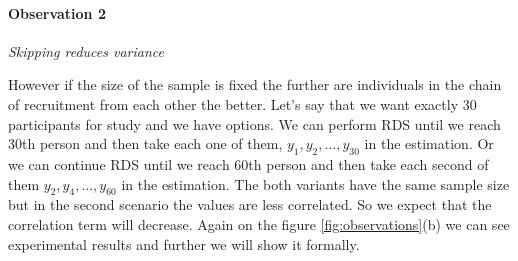 \documentclass[12pt]{report}
\begin{document}
\paragraph{Observation 2} \textit{Skipping reduces variance}

However if the size of the sample is fixed the further are individuals in the chain of recruitment from each other the better. Let's say that we want exactly 30 participants for study and we have options. We can perform RDS until we reach 30th person and then take each one of them, $y_1, y_2, ..., y_{30}$ in the estimation. Or we can continue RDS until we reach 60th person and then take each second of them $y_2, y_4, ..., y_{60}$ in the estimation. The both variants have the same sample size but in the second scenario the values are less correlated. So we expect that the correlation term will decrease. Again on the figure \ref{fig:observations}(b) we can see experimental results and further we will show it formally.
\end{document}
